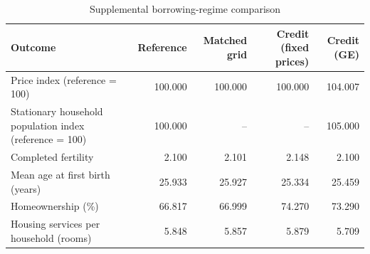 \begin{table}[!htbp]
\centering
\caption{Supplemental borrowing-regime comparison}
\label{tab:borrowing-comparison}
\begin{tabular}{lrrrr}
\toprule
Outcome & Reference & Matched grid & Credit (fixed prices) & Credit (GE) \\
\midrule
Price index (reference = 100) & 100.000 & 100.000 & 100.000 & 104.007 \\
Stationary household population index (reference = 100) & 100.000 & -- & -- & 105.000 \\
Completed fertility & 2.100 & 2.101 & 2.148 & 2.100 \\
Mean age at first birth (years) & 25.933 & 25.927 & 25.334 & 25.459 \\
Homeownership (\%) & 66.817 & 66.999 & 74.270 & 73.290 \\
Housing services per household (rooms) & 5.848 & 5.857 & 5.879 & 5.709 \\
\bottomrule
\end{tabular}
\par{}
\end{table}
